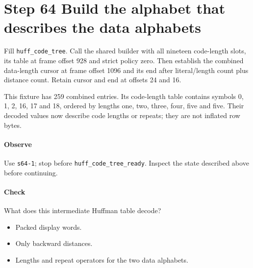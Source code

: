 \section{Step 64 Build the alphabet that describes the data alphabets}\label{png-huff-s64}
Fill \texttt{huff\_code\_tree}. Call the shared builder with all nineteen code-length slots, its table at frame offset 928 and strict policy zero. Then establish the combined data-length cursor at frame offset 1096 and its end after literal/length count plus distance count. Retain cursor and end at offsets 24 and 16.

This fixture has 259 combined entries. Its code-length table contains symbols 0, 1, 2, 16, 17 and 18, ordered by lengths one, two, three, four, five and five. Their decoded values now describe code lengths or repeats; they are not inflated row bytes.

\paragraph{Observe} Use \texttt{s64-1}; stop before \texttt{huff\_code\_tree\_ready}. Inspect the state described above before continuing.

\paragraph{Check} What does this intermediate Huffman table decode?
\begin{itemize}
\item[A.] Packed display words.
\item[B.] Only backward distances.
\item[C.] Lengths and repeat operators for the two data alphabets.
\end{itemize}
